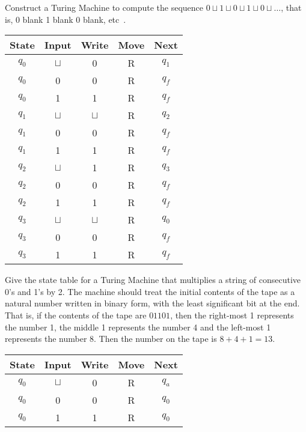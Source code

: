 \documentclass[a4paper, 12pt]{exam}
\begin{document}
\begin{questions}
\question
  Construct a Turing Machine to compute the sequence $0 \sqcup 1 \sqcup 0 \sqcup 1 \sqcup 0 \sqcup \ldots$, that is, 0 blank 1 blank 0 blank, etc~\cite{turing37}.
  \begin{solution}
    \begin{table}[H]
      \centering
      \begin{tabular}{ccccc}
        \toprule
            State & Input & Write & Move & Next \\
        \midrule
            $q_0$ & $\sqcup$ & 0 & R & $q_1$ \\
            $q_0$ & 0 & 0 & R & $q_f$ \\
            $q_0$ & 1 & 1 & R & $q_f$ \\
        \midrule
            $q_1$ & $\sqcup$ & $\sqcup$ & R & $q_2$ \\
            $q_1$ & 0 & 0 & R & $q_f$ \\
            $q_1$ & 1 & 1 & R & $q_f$ \\
        \midrule
            $q_2$ & $\sqcup$ & 1 & R & $q_3$ \\
            $q_2$ & 0 & 0 & R & $q_f$ \\
            $q_2$ & 1 & 1 & R & $q_f$ \\
        \midrule
            $q_3$ & $\sqcup$ & $\sqcup$ & R & $q_0$ \\
            $q_3$ & 0 & 0 & R & $q_f$ \\
            $q_3$ & 1 & 1 & R & $q_f$ \\
        \bottomrule
        \hline
      \end{tabular}
    \end{table}
  \end{solution}


\question
  Give the state table for a Turing Machine that multiplies a string of consecutive 0's and 1's by 2.
  The machine should treat the initial contents of the tape as a natural number written in binary form, with the least significant bit at the end.
  That is, if the contents of the tape are $01101$, then the right-most 1 represents the number 1, the middle 1 represents the number 4 and the left-most 1 represents the number 8.
  Then the number on the tape is $8+4+1=13$.
  \begin{solution}
    \begin{table}[H]
      \centering
      \begin{tabular}{ccccc}
        \toprule
            State & Input & Write & Move & Next \\
        \midrule
            $q_0$ & $\sqcup$ & 0 & R & $q_a$ \\
            $q_0$ & 0 & 0 & R & $q_0$ \\
            $q_0$ & 1 & 1 & R & $q_0$ \\
        \bottomrule
        \hline
      \end{tabular}
    \end{table}
  \end{solution}



\end{questions}
\end{document}
